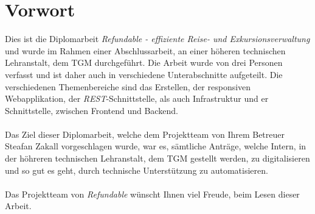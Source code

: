 \chapter{Vorwort}
Dies ist die Diplomarbeit \textit{Refundable - effiziente Reise- und Exkursionsverwaltung} und wurde im Rahmen einer Abschlussarbeit, an einer höheren technischen Lehranstalt, dem TGM durchgeführt. Die Arbeit wurde von drei Personen verfasst und ist daher auch in verschiedene Unterabschnitte aufgeteilt. Die verschiedenen Themenbereiche sind das Erstellen, der responsiven Webapplikation, der \textit{REST}-Schnittstelle, als auch Infrastruktur und er Schnittstelle, zwischen Frontend und Backend.\\
~\\
Das Ziel dieser Diplomarbeit, welche dem Projektteam von Ihrem Betreuer Steafan Zakall vorgeschlagen wurde, war es, sämtliche Anträge, welche Intern, in der höhreren technischen Lehranstalt, dem TGM gestellt werden, zu digitalisieren und so gut es geht, durch technische Unterstützung zu automatisieren.\\
~\\
Das Projektteam von \textit{Refundable} wünscht Ihnen viel Freude, beim Lesen dieser Arbeit.